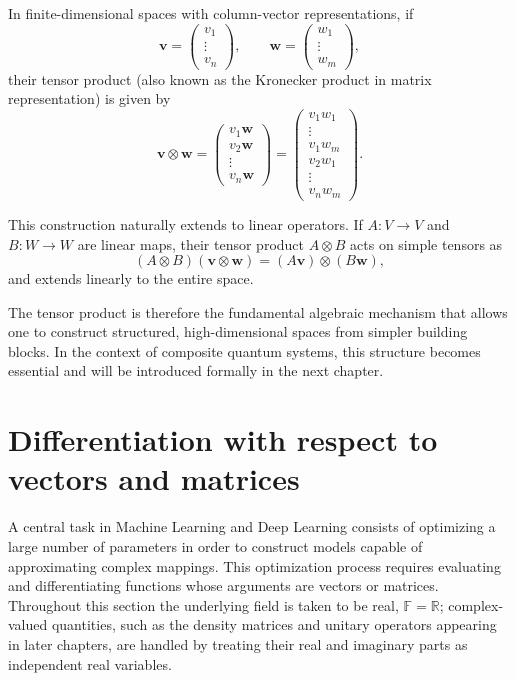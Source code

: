 In finite-dimensional spaces with column-vector representations, if
\[
\mathbf{v} =
\begin{pmatrix}
v_1 \\
\vdots \\
v_n
\end{pmatrix},
\qquad
\mathbf{w} =
\begin{pmatrix}
w_1 \\
\vdots \\
w_m
\end{pmatrix},
\]
their tensor product (also known as the Kronecker product in matrix representation) is given by
\[
\mathbf{v} \otimes \mathbf{w} =
\begin{pmatrix}
v_1 \mathbf{w} \\
v_2 \mathbf{w} \\
\vdots \\
v_n \mathbf{w}
\end{pmatrix}
=
\begin{pmatrix}
v_1 w_1 \\
\vdots \\
v_1 w_m \\
v_2 w_1 \\
\vdots \\
v_n w_m
\end{pmatrix}.
\]

This construction naturally extends to linear operators. If $A : V \to V$ and $B : W \to W$ are linear maps, their tensor product $A \otimes B$ acts on simple tensors as
\begin{equation}
    (A \otimes B)(\mathbf{v} \otimes \mathbf{w}) = (A\mathbf{v}) \otimes (B\mathbf{w}),
\end{equation}
and extends linearly to the entire space.

The tensor product is therefore the fundamental algebraic mechanism that allows one to construct structured, high-dimensional spaces from simpler building blocks. In the context of composite quantum systems, this structure becomes essential and will be introduced formally in the next chapter.

\section{Differentiation with respect to vectors and matrices}
\label{sec:differentiation}

A central task in Machine Learning and Deep Learning consists of optimizing a large number of parameters in order to construct models capable of approximating complex mappings. This optimization process requires evaluating and differentiating functions whose arguments are vectors or matrices. Throughout this section the underlying field is taken to be real, $\mathbb{F} = \mathbb{R}$; complex-valued quantities, such as the density matrices and unitary operators appearing in later chapters, are handled by treating their real and imaginary parts as independent real variables.

